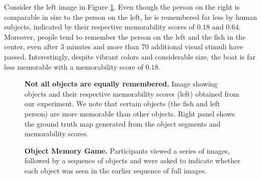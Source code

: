 

Consider the left image in Figure \ref{fig:introPhoto}. Even though the person on the right is comparable in size to the person on the left, he is remembered far less by human subjects, indicated by their respective memorability scores of $0.18$ and $0.64$. Moreover, people tend to remember the person on the left and the fish in the center, even after $3$ minutes and  more than 70 additional visual stimuli have passed. Interestingly, despite vibrant colors and considerable size, the boat is far less memorable with a memorability score of $0.18$.

\begin{figure}[t]
\centering
{}
\vspace{-12pt}\caption{\footnotesize\textbf{Not all objects are equally remembered.} Image showing objects and their respective memorability scores (left) obtained from our experiment. We note that certain objects (the fish and left person) are more memorable than other objects. Right panel shows the ground truth map generated from the object segments and memorability scores.}\label{fig:introPhoto}%
\end{figure}

\begin{figure}[!htb]
\centering
{}
\vspace{-5mm}\caption{\footnotesize\textbf{Object Memory Game.} Participants viewed a series of images, followed by a sequence of objects and were asked to indicate whether each object was seen in the earlier sequence of full images. }\label{fig:mainTask}%
\end{figure}

